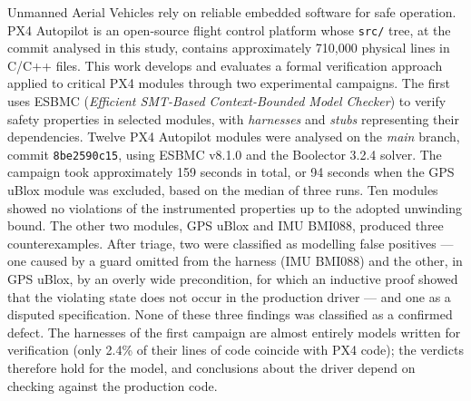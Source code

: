\begin{abstract}
\noindent
\textbf{Palavras-chave}: Verificação Formal; PX4 Autopilot; ESBMC; Bounded Model Checking; VANT; Sistemas Embarcados.
\end{abstract}

\begin{foreignabstract}

Unmanned Aerial Vehicles rely on reliable embedded software for safe operation. PX4 Autopilot is an open-source flight control platform whose \texttt{src/} tree, at the commit analysed in this study, contains approximately 710,000 physical lines in C/C++ files. This work develops and evaluates a formal verification approach applied to critical PX4 modules through two experimental campaigns. The first uses ESBMC (\textit{Efficient SMT-Based Context-Bounded Model Checker}) to verify safety properties in selected modules, with \textit{harnesses} and \textit{stubs} representing their dependencies. Twelve PX4 Autopilot modules were analysed on the \textit{main} branch, commit \texttt{8be2590c15}, using ESBMC v8.1.0 and the Boolector 3.2.4 solver. The campaign took approximately 159 seconds in total, or 94 seconds when the GPS uBlox module was excluded, based on the median of three runs. Ten modules showed no violations of the instrumented properties up to the adopted unwinding bound. The other two modules, GPS uBlox and IMU BMI088, produced three counterexamples. After triage, two were classified as modelling false positives --- one caused by a guard omitted from the harness (IMU BMI088) and the other, in GPS uBlox, by an overly wide precondition, for which an inductive proof showed that the violating state does not occur in the production driver --- and one as a disputed specification. None of these three findings was classified as a confirmed defect. The harnesses of the first campaign are almost entirely models written for verification (only 2.4\% of their lines of code coincide with PX4 code); the verdicts therefore hold for the model, and conclusions about the driver depend on checking against the production code.


\end{foreignabstract}
